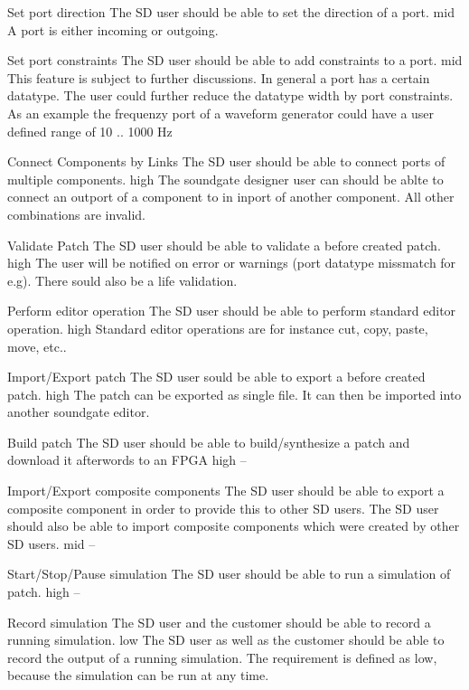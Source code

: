 	{Set port direction}
	{The SD user should be able to set the direction of a port.}
	{mid}
	{A port is either incoming or outgoing.}
	
	{Set port constraints}
	{The SD user should be able to add constraints to a port.}
	{mid}
	{This feature is subject to further discussions. In general a port has a certain datatype. The user could further reduce the datatype width by port constraints. As an example the frequenzy port of a waveform generator could have a user defined range of 10 .. 1000 Hz }
	
	{Connect Components by Links}
	{The SD user should be able to connect ports of multiple components.}
	{high}
	{The soundgate designer user can should be ablte to connect an outport of a component to in inport of another component. All other combinations are invalid.}
	
	{Validate Patch}
	{The SD user should be able to validate a before created patch.}
	{high}
	{The user will be notified on error or warnings (port datatype missmatch for e.g). There sould also be a life validation.}
	
	{Perform editor operation}
	{The SD user should be able to perform standard editor operation.}
	{high}
	{Standard editor operations are for instance cut, copy, paste, move, etc..}
	
	{Import/Export patch}
	{The SD user sould be able to export a before created patch.}
	{high}
	{The patch can be exported as single file. It can then be imported into another soundgate editor.}
	
	{Build patch}
	{The SD user should be able to build/synthesize a patch and download it afterwords to an FPGA}
	{high}
	{--}
	
	{Import/Export composite components}
	{The SD user should be able to export a composite component in order to provide this to other SD users. The SD user should also be able to import composite components which were created by other SD users.}
	{mid}
	{--}
	
	{Start/Stop/Pause simulation}
	{The SD user should be able to run a simulation of patch.}
	{high}
	{--}
	
	{Record simulation}
	{The SD user and the customer should be able to record a running simulation.}
	{low}
	{The SD user as well as the customer should be able to record the output of a running simulation. The requirement is defined as low, because the simulation can be run at any time.}
	
